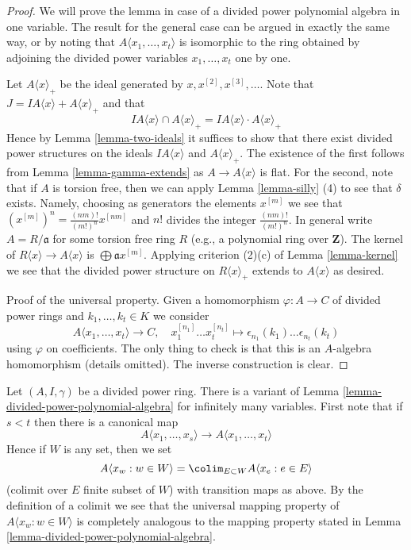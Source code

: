 \begin{proof}
We will prove the lemma in case of a divided power polynomial algebra
in one variable. The result for the general case can be argued in exactly
the same way, or by noting that $A\langle x_1, \ldots, x_t\rangle$ is
isomorphic to the ring obtained by adjoining the divided power variables
$x_1, \ldots, x_t$ one by one.

\medskip\noindent
Let $A\langle x \rangle_{+}$ be the ideal generated by
$x, x^{[2]}, x^{[3]}, \ldots$.
Note that $J = IA\langle x \rangle + A\langle x \rangle_{+}$
and that
$$
IA\langle x \rangle \cap A\langle x \rangle_{+} =
IA\langle x \rangle \cdot A\langle x \rangle_{+}
$$
Hence by Lemma \ref{lemma-two-ideals} it suffices to show that there
exist divided power structures on the ideals $IA\langle x \rangle$ and
$A\langle x \rangle_{+}$. The existence of the first follows from
Lemma \ref{lemma-gamma-extends} as $A \to A\langle x \rangle$ is flat.
For the second, note that if $A$ is torsion free, then we can apply
Lemma \ref{lemma-silly} (4) to see that $\delta$ exists. Namely, choosing
as generators the elements $x^{[m]}$ we see that
$(x^{[m]})^n = \frac{(nm)!}{(m!)^n} x^{[nm]}$
and $n!$ divides the integer $\frac{(nm)!}{(m!)^n}$.
In general write $A = R/\mathfrak a$ for some torsion free ring $R$
(e.g., a polynomial ring over $\mathbf{Z}$). The kernel of
$R\langle x \rangle \to A\langle x \rangle$ is
$\bigoplus \mathfrak a x^{[m]}$. Applying criterion (2)(c) of
Lemma \ref{lemma-kernel} we see that the divided power structure
on $R\langle x \rangle_{+}$ extends to $A\langle x \rangle$ as
desired.

\medskip\noindent
Proof of the universal property. Given a homomorphism $\varphi : A \to C$
of divided power rings and $k_1, \ldots, k_t \in K$ we consider
$$
A\langle x_1, \ldots, x_t \rangle \to C,\quad
x_1^{[n_1]} \ldots x_t^{[n_t]} \longmapsto
\epsilon_{n_1}(k_1) \ldots \epsilon_{n_t}(k_t)
$$
using $\varphi$ on coefficients. The only thing to check is that
this is an $A$-algebra homomorphism (details omitted). The inverse
construction is clear.
\end{proof}

\begin{remark}
\label{remark-divided-power-polynomial-algebra}
Let $(A, I, \gamma)$ be a divided power ring.
There is a variant of Lemma \ref{lemma-divided-power-polynomial-algebra}
for infinitely many variables. First note that if $s < t$ then there
is a canonical map
$$
A\langle x_1, \ldots, x_s \rangle \to A\langle x_1, \ldots, x_t\rangle
$$
Hence if $W$ is any set, then we set
$$
A\langle x_w: w \in W\rangle =
\colim_{E \subset W} A\langle x_e:e \in E\rangle
$$
(colimit over $E$ finite subset of $W$)
with transition maps as above. By the definition of a colimit we see
that the universal mapping property of $A\langle x_w: w \in W\rangle$ is
completely analogous to the mapping property stated in
Lemma \ref{lemma-divided-power-polynomial-algebra}.
\end{remark}

